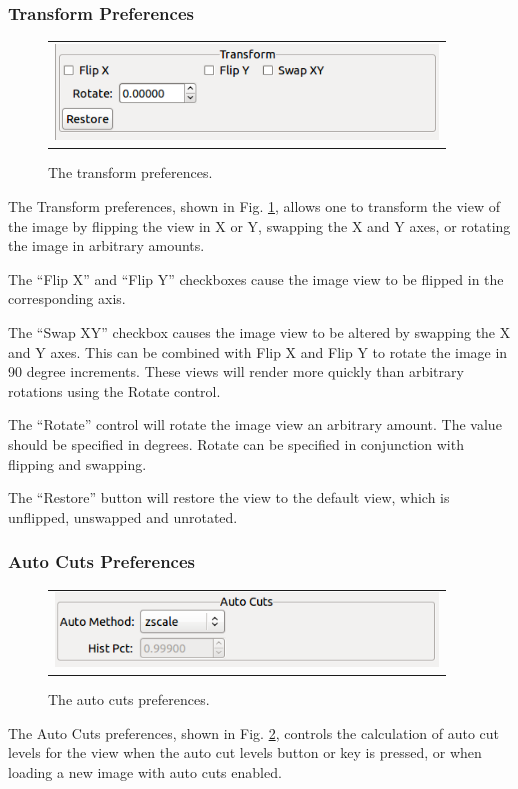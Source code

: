 \documentclass[11pt]{report}
\begin{document}
\subsubsection{Transform Preferences}
\begin{figure}
  \begin{center}
    \begin{tabular}{c}
      \includegraphics[width=4in]{transform-prefs.png}
    \end{tabular}
  \end{center}
  \caption[example] 
          { \label{fig:prefs-transform} 
            The transform preferences.} 
\end{figure} 
The Transform preferences, shown in Fig. \ref{fig:prefs-transform},
allows one to transform the view of the image by flipping the view in X
or Y, swapping the X and Y axes, or rotating the image in arbitrary amounts.

The ``Flip X'' and ``Flip Y'' checkboxes cause the image view to be
flipped in the corresponding axis.

The ``Swap XY'' checkbox causes the image view to be altered by swapping
the X and Y axes.  This can be combined with Flip X and Flip Y to rotate
the image in 90 degree increments.  These views will render more quickly
than arbitrary rotations using the Rotate control. 

The ``Rotate'' control will rotate the image view an arbitrary amount.
The value should be specified in degrees.  Rotate can be specified in
conjunction with flipping and swapping.

The ``Restore'' button will restore the view to the default view, which
is unflipped, unswapped and unrotated.

\subsubsection{Auto Cuts Preferences}
\label{sec:autocuts}
\begin{figure}
  \begin{center}
    \begin{tabular}{c}
      \includegraphics[width=4in]{autocuts-prefs.png}
    \end{tabular}
  \end{center}
  \caption[example] 
          { \label{fig:prefs-autocuts} 
            The auto cuts preferences.} 
\end{figure} 
The Auto Cuts preferences, shown in Fig. \ref{fig:prefs-autocuts},
controls the calculation of auto cut levels for the view when the auto
cut levels button or key is pressed, or when loading a new image with
auto cuts enabled. 
\end{document}
